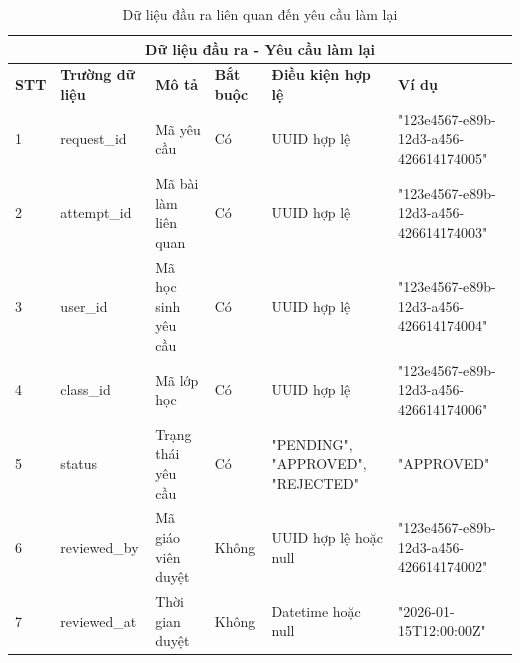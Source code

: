 \documentclass[../DoAn.tex]{subfiles}
\begin{document}
\begin{table}[h!]
\centering
\begin{tabular}{|m{1cm}|m{2.5cm}|m{3cm}|m{1cm}|m{2.5cm}|m{3.5cm}|}
    \hline
    \multicolumn{6}{|c|}{\textbf{Dữ liệu đầu ra - Yêu cầu làm lại}} \\
    \hline
    \textbf{STT} & \textbf{Trường dữ liệu} & \textbf{Mô tả} & \textbf{Bắt buộc} & \textbf{Điều kiện hợp lệ} & \textbf{Ví dụ} \\
    \hline
    1 & request\_id & Mã yêu cầu & Có & UUID hợp lệ & "123e4567-e89b-12d3-a456-426614174005" \\
    \hline
    2 & attempt\_id & Mã bài làm liên quan & Có & UUID hợp lệ & "123e4567-e89b-12d3-a456-426614174003" \\
    \hline
    3 & user\_id & Mã học sinh yêu cầu & Có & UUID hợp lệ & "123e4567-e89b-12d3-a456-426614174004" \\
    \hline
    4 & class\_id & Mã lớp học & Có & UUID hợp lệ & "123e4567-e89b-12d3-a456-426614174006" \\
    \hline
    5 & status & Trạng thái yêu cầu & Có & "PENDING", "APPROVED", "REJECTED" & "APPROVED" \\
    \hline
    6 & reviewed\_by & Mã giáo viên duyệt & Không & UUID hợp lệ hoặc null & "123e4567-e89b-12d3-a456-426614174002" \\
    \hline
    7 & reviewed\_at & Thời gian duyệt & Không & Datetime hoặc null & "2026-01-15T12:00:00Z" \\
    \hline
\end{tabular}
\caption{Dữ liệu đầu ra liên quan đến yêu cầu làm lại}
\end{table}
\end{document}
